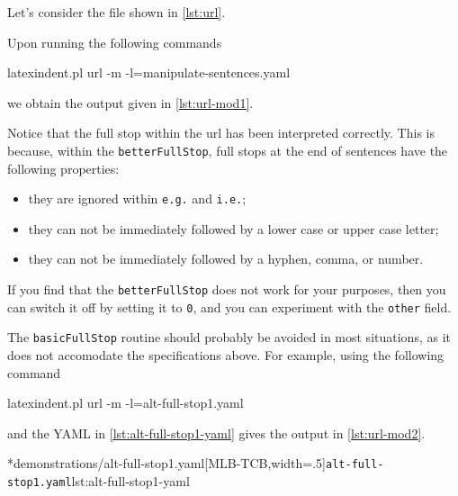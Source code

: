 	Let's consider the file shown in \cref{lst:url}.


	Upon running the following commands
	\begin{commandshell}
latexindent.pl url -m -l=manipulate-sentences.yaml
\end{commandshell}
	we obtain the output given in \cref{lst:url-mod1}.


	Notice that the full stop within the url has been interpreted correctly. This is because,
	within the \texttt{betterFullStop}, full stops at the end of sentences have the
	following properties:
	\begin{itemize}
		\item they are ignored within \texttt{e.g.} and \texttt{i.e.};
		\item they can not be immediately followed by a lower case or upper case letter;
		\item they can not be immediately followed by a hyphen, comma, or number.
	\end{itemize}
	If you find that the \texttt{betterFullStop} does not work for your purposes, then
	you can switch it off by setting it to \texttt{0}, and you can
	experiment with the \texttt{other} field.

	The \texttt{basicFullStop} routine should probably be avoided in most situations, as
	it does not accomodate the specifications above. For example, using the following command
	\begin{commandshell}
latexindent.pl url -m -l=alt-full-stop1.yaml
\end{commandshell}
	and the YAML in \cref{lst:alt-full-stop1-yaml} gives the output in
	\cref{lst:url-mod2}.

        \begin{cmhtcbraster}[ raster left skip=-3.5cm,
                             raster right skip=-2cm,
            raster force size=false,
            raster column 1/.style={add to width=.1\textwidth},
                             raster column skip=.06\linewidth]
			\cmhlistingsfromfile[style=yaml-LST]*{demonstrations/alt-full-stop1.yaml}[MLB-TCB,width=.5\textwidth]{\texttt{alt-full-stop1.yaml}}{lst:alt-full-stop1-yaml}
        \end{cmhtcbraster}

